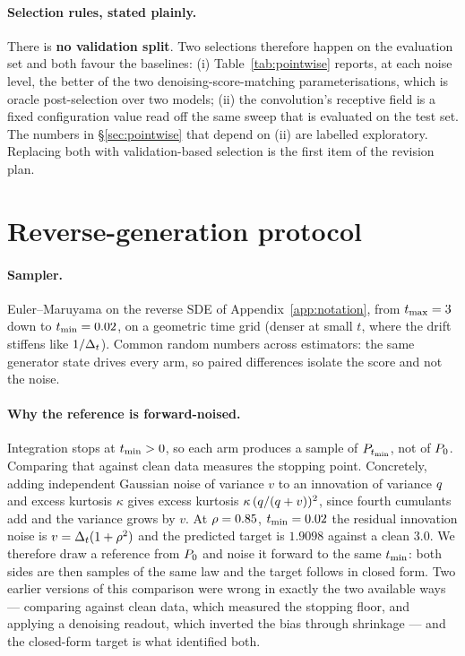 \paragraph{Selection rules, stated plainly.} There is \textbf{no validation split}. Two selections
therefore happen on the evaluation set and both favour the baselines: (i) Table~\ref{tab:pointwise}
reports, at each noise level, the better of the two denoising-score-matching parameterisations,
which is oracle post-selection over two models; (ii) the convolution's receptive field is a fixed
configuration value read off the same sweep that is evaluated on the test set. The numbers in
\S\ref{sec:pointwise} that depend on (ii) are labelled exploratory. Replacing both with
validation-based selection is the first item of the revision plan.

\section{Reverse-generation protocol}
\label{app:reverse}

\paragraph{Sampler.} Euler--Maruyama on the reverse SDE of Appendix~\ref{app:notation}, from
$t_{\max}=3$ down to $t_{\min}=0.02$, on a geometric time grid (denser at small $t$, where the drift
stiffens like $1/\Delta_t$). Common random numbers across estimators: the same generator state drives
every arm, so paired differences isolate the score and not the noise.

\paragraph{Why the reference is forward-noised.} Integration stops at $t_{\min}>0$, so each arm
produces a sample of $P_{t_{\min}}$, not of $P_0$. Comparing that against clean data measures the
stopping point. Concretely, adding independent Gaussian noise of variance $v$ to an innovation of
variance $q$ and excess kurtosis $\kappa$ gives excess kurtosis
$\kappa\,(q/(q+v))^2$, since fourth cumulants add and the variance grows by $v$. At
$\rho=0.85$, $t_{\min}=0.02$ the residual innovation noise is $v = \Delta_t(1+\rho^2)$ and the
predicted target is $1.9098$ against a clean $3.0$. We therefore draw a reference from $P_0$ and
noise it forward to the same $t_{\min}$: both sides are then samples of the same law and the target
follows in closed form. Two earlier versions of this comparison were wrong in exactly the two
available ways --- comparing against clean data, which measured the stopping floor, and applying
a denoising readout, which inverted the bias through shrinkage --- and the closed-form target is
what identified both.

